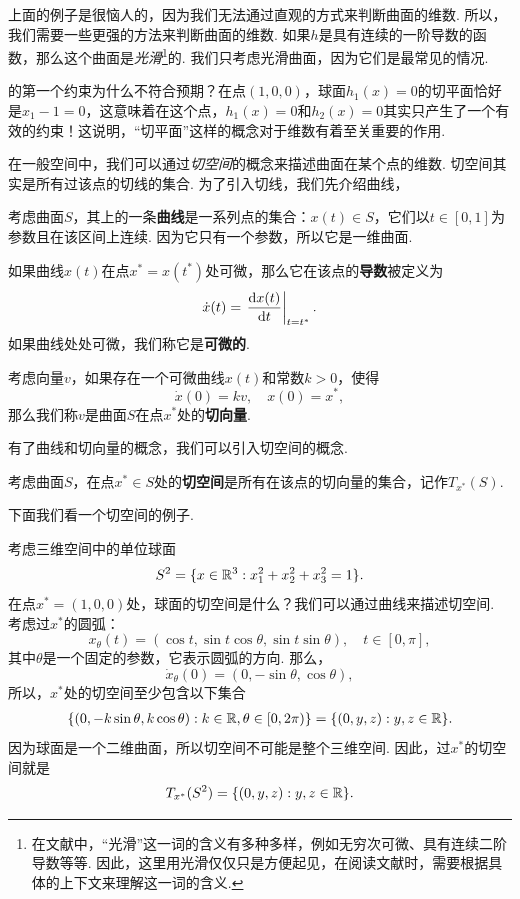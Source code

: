上面的例子是很恼人的，因为我们无法通过直观的方式来判断曲面的维数. 所以，我们需要一些更强的方法来判断曲面的维数. 如果$h$是具有连续的一阶导数的函数，那么这个曲面是\textit{光滑}\footnote{在文献中，“光滑”这一词的含义有多种多样，例如无穷次可微、具有连续二阶导数等等. 因此，这里用光滑仅仅只是方便起见，在阅读文献时，需要根据具体的上下文来理解这一词的含义.}的. 我们只考虑光滑曲面，因为它们是最常见的情况.

 的第一个约束为什么不符合预期？在点$(1,0,0)$，球面$h_1(x)=0$的切平面恰好是$x_1 - 1 = 0$，这意味着在这个点，$h_1(x)=0$和$h_2(x)=0$其实只产生了一个有效的约束！这说明，“切平面”这样的概念对于维数有着至关重要的作用. 
    
在一般空间中，我们可以通过\textit{切空间}的概念来描述曲面在某个点的维数. 切空间其实是所有过该点的切线的集合. 为了引入切线，我们先介绍曲线，
\begin{definition}[曲线和切向量]
    考虑曲面$S$，其上的一条\textbf{曲线}是一系列点的集合：$x(t)\in S$，它们以$t\in[0,1]$为参数且在该区间上连续. 因为它只有一个参数，所以它是一维曲面. 

    如果曲线$x(t)$在点$x^*=x(t^*)$处可微，那么它在该点的\textbf{导数}被定义为
    \[\dot{x}(t)=\left.\frac{\mathrm{d} x(t)}{\mathrm{d} t}\right|_{t=t^*}.\]
    如果曲线处处可微，我们称它是\textbf{可微的}. 

    考虑向量$v$，如果存在一个可微曲线$x(t)$和常数$k>0$，使得
    \[\dot{x}(0)=kv,\quad x(0)=x^*,\]
    那么我们称$v$是曲面$S$在点$x^*$处的\textbf{切向量}.
\end{definition}

有了曲线和切向量的概念，我们可以引入切空间的概念. 

\begin{definition}[切空间]
    考虑曲面$S$，在点$x^*\in S$处的\textbf{切空间}是所有在该点的切向量的集合，记作$T_{x^*}(S)$.
\end{definition}

下面我们看一个切空间的例子.

\begin{example}[三维球面的切空间]\label{ex:tan-space}
    考虑三维空间中的单位球面
    \[S^2=\{x\in\mathbb{R}^3:x_1^2+x_2^2+x_3^2=1\}.\]
    在点$x^*=(1,0,0)$处，球面的切空间是什么？我们可以通过曲线来描述切空间. 考虑过$x^*$的圆弧：
    \[x_\theta(t)=(\cos t,\sin t\cos\theta,\sin t\sin\theta), \quad t\in[0,\pi],\]
    其中$\theta$是一个固定的参数，它表示圆弧的方向. 那么，
    \[\dot{x}_\theta(0)=(0,-\sin\theta,\cos\theta),\]
    所以，$x^*$处的切空间至少包含以下集合
    \begin{align*}
        \{(0,-k\sin \theta,k\cos\theta):k\in\mathbb{R},\theta\in[0,2\pi)\}= \{(0,y,z):y,z\in\mathbb{R}\}.
    \end{align*}
    因为球面是一个二维曲面，所以切空间不可能是整个三维空间. 因此，过$x^*$的切空间就是
    \[T_{x^*}(S^2)=\{(0,y,z):y,z\in\mathbb{R}\}.\]
\end{example}

